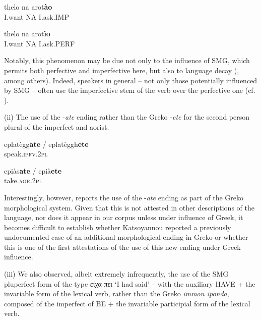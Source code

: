 \documentclass[output=paper,hidelinks]{langscibook}
\begin{document}
\ea 
\label{ex:key:1}

\gll thelo na arot\textbf{ào} \\
I.want NA I.ask.IMP\\
\z 

\ea 
\label{ex:key:2}

\gll thelo na arot\textbf{ìo} \\
I.want NA I.ask.PERF \\
\z 



Notably, this phenomenon may be due not only to the influence of SMG, which permits both perfective and imperfective here, but also to language decay (\citealt{Sasse1992}, among others). Indeed, speakers in general -- not only those potentially influenced by SMG -- often use the imperfective stem of the verb over the perfective one (cf. \cite{Squillaci-inprep}). 



(ii) The use of the -\textit{ate} ending rather than the Greko -\textit{ete} for the second person plural of the imperfect and aorist. 



\ea 
\label{ex:key:3}

\gll eplatègg\textbf{ate} / eplatèggh\textbf{ete} \\
speak.\textsc{ipfv}.2\textsc{pl} \\
\z 



\ea 
\label{ex:key:4}

\gll epiàs\textbf{ate} / epià\textbf{ete} \\
take.\textsc{aor}.2\textsc{pl}\\
\z 



Interestingly, however, \citet[288--290]{Katsoyannou1995} reports the use of the -\textit{ate} ending as part of the Greko morphological system. Given that this is not attested in other descriptions of the language, nor does it appear in our corpus unless under influence of Greek, it becomes difficult to establish whether Katsoyannou reported a previously undocumented case of an additional morphological ending in Greko or whether this is one of the first attestations of the use of this new ending under Greek influence.



(iii) We also observed, albeit extremely infrequently, the use of the SMG pluperfect form of the type {είχα πει} `I had said’ -- with the auxiliary HAVE + the invariable form of the lexical verb, rather than the Greko \textit{immon iponda}, composed of the imperfect of BE + the invariable participial form of the lexical verb.
\end{document}
